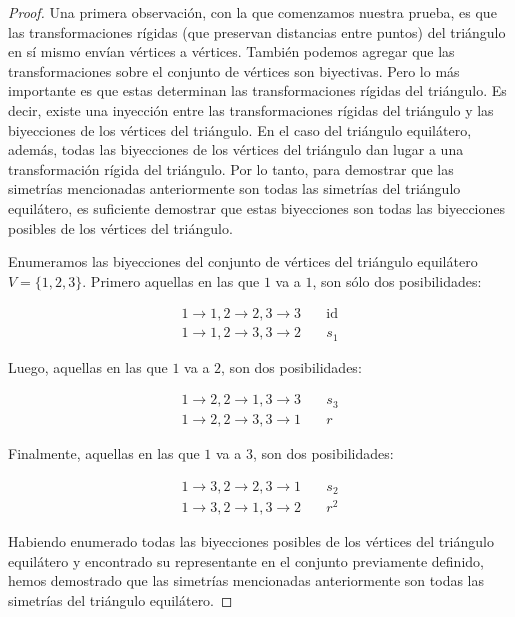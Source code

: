\documentclass{article}
\begin{document}
\begin{proof}
  Una primera observación, con la que comenzamos nuestra prueba, es que las transformaciones rígidas (que preservan distancias entre puntos) del triángulo en sí mismo envían vértices a vértices. También podemos agregar que las transformaciones sobre el conjunto de vértices son biyectivas. Pero lo más importante es que estas determinan las transformaciones rígidas del triángulo. Es decir, existe una inyección entre las transformaciones rígidas del triángulo y las biyecciones de los vértices del triángulo. En el caso del triángulo equilátero, además, todas las biyecciones de los vértices del triángulo dan lugar a una transformación rígida del triángulo. Por lo tanto, para demostrar que las simetrías mencionadas anteriormente son todas las simetrías del triángulo equilátero, es suficiente demostrar que estas biyecciones son todas las biyecciones posibles de los vértices del triángulo.

  Enumeramos las biyecciones del conjunto de vértices del triángulo equilátero $V = \{1, 2, 3\}$. Primero aquellas en las que $1$ va a $1$, son sólo dos posibilidades:

  \begin{align*}
    1 \rightarrow 1, 2 \rightarrow 2, 3 \rightarrow 3 & \quad \text{id} \\
    1 \rightarrow 1, 2 \rightarrow 3, 3 \rightarrow 2 & \quad s_1
  \end{align*}

  Luego, aquellas en las que $1$ va a $2$, son dos posibilidades:

  \begin{align*}
    1 \rightarrow 2, 2 \rightarrow 1, 3 \rightarrow 3 & \quad s_3 \\
    1 \rightarrow 2, 2 \rightarrow 3, 3 \rightarrow 1 & \quad r
  \end{align*}

  Finalmente, aquellas en las que $1$ va a $3$, son dos posibilidades:

  \begin{align*}
    1 \rightarrow 3, 2 \rightarrow 2, 3 \rightarrow 1 & \quad s_2 \\
    1 \rightarrow 3, 2 \rightarrow 1, 3 \rightarrow 2 & \quad r^2
  \end{align*}

  Habiendo enumerado todas las biyecciones posibles de los vértices del triángulo equilátero y encontrado su representante en el conjunto previamente definido, hemos demostrado que las simetrías mencionadas anteriormente son todas las simetrías del triángulo equilátero.

\end{proof}
\end{document}

